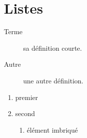 \documentclass{article}
\begin{document}
\hsize=380pt
\section{Listes}
\begin{description}
\item[Terme] sa d\'efinition courte.
\item[Autre] une autre d\'efinition.
\end{description}

\begin{enumerate}
\item premier
\item second
\begin{enumerate}
\item \'el\'ement imbriqu\'e
\end{enumerate}
\end{enumerate}
\end{document}
